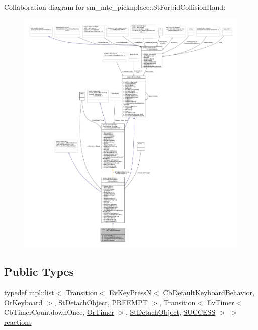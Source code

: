 Collaboration diagram for sm\+\_\+mtc\+\_\+picknplace\+:\+:St\+Forbid\+Collision\+Hand\+:
\nopagebreak
\begin{figure}[H]
\begin{center}
\leavevmode
\includegraphics[width=350pt]{structsm__mtc__picknplace_1_1StForbidCollisionHand__coll__graph}
\end{center}
\end{figure}
\subsection*{Public Types}
\begin{DoxyCompactItemize}
\item 
typedef mpl\+::list$<$ Transition$<$ Ev\+Key\+PressN$<$ Cb\+Default\+Keyboard\+Behavior, \hyperlink{classsm__mtc__picknplace_1_1OrKeyboard}{Or\+Keyboard} $>$, \hyperlink{structsm__mtc__picknplace_1_1StDetachObject}{St\+Detach\+Object}, \hyperlink{classPREEMPT}{P\+R\+E\+E\+M\+PT} $>$, Transition$<$ Ev\+Timer$<$ Cb\+Timer\+Countdown\+Once, \hyperlink{classsm__mtc__picknplace_1_1OrTimer}{Or\+Timer} $>$, \hyperlink{structsm__mtc__picknplace_1_1StDetachObject}{St\+Detach\+Object}, \hyperlink{classSUCCESS}{S\+U\+C\+C\+E\+SS} $>$ $>$ \hyperlink{structsm__mtc__picknplace_1_1StForbidCollisionHand_a11e64e3cf4cf1b43ff4479d7fd1d541c}{reactions}
\end{DoxyCompactItemize}
